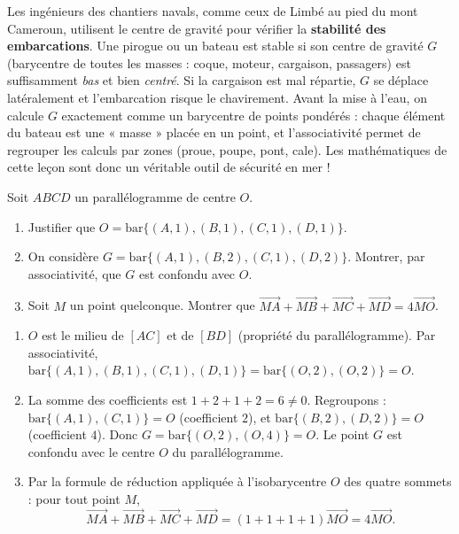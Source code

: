 \documentclass[11pt]{article}
\begin{document}
\begin{savaistu}
Les ingénieurs des chantiers navals, comme ceux de Limbé au pied du mont Cameroun, utilisent le centre de gravité pour vérifier la \textbf{stabilité des embarcations}. Une pirogue ou un bateau est stable si son centre de gravité $G$ (barycentre de toutes les masses : coque, moteur, cargaison, passagers) est suffisamment \emph{bas} et bien \emph{centré}. Si la cargaison est mal répartie, $G$ se déplace latéralement et l'embarcation risque le chavirement. Avant la mise à l'eau, on calcule $G$ exactement comme un barycentre de points pondérés : chaque élément du bateau est une « masse » placée en un point, et l'associativité permet de regrouper les calculs par zones (proue, poupe, pont, cale). Les mathématiques de cette leçon sont donc un véritable outil de sécurité en mer !
\end{savaistu}

\begin{exercice}
Soit $ABCD$ un parallélogramme de centre $O$.
\begin{enumerate}
\item Justifier que $O=\mathrm{bar}\{(A,1),(B,1),(C,1),(D,1)\}$.
\item On considère $G=\mathrm{bar}\{(A,1),(B,2),(C,1),(D,2)\}$. Montrer, par associativité, que $G$ est confondu avec $O$.
\item Soit $M$ un point quelconque. Montrer que $\overrightarrow{MA}+\overrightarrow{MB}+\overrightarrow{MC}+\overrightarrow{MD}=4\overrightarrow{MO}$.
\end{enumerate}
\end{exercice}

\begin{corrige}[Exercice]
\begin{enumerate}
\item $O$ est le milieu de $[AC]$ et de $[BD]$ (propriété du parallélogramme). Par associativité, $\mathrm{bar}\{(A,1),(B,1),(C,1),(D,1)\}=\mathrm{bar}\{(O,2),(O,2)\}=O$.
\item La somme des coefficients est $1+2+1+2=6\neq 0$. Regroupons : $\mathrm{bar}\{(A,1),(C,1)\}=O$ (coefficient $2$), et $\mathrm{bar}\{(B,2),(D,2)\}=O$ (coefficient $4$). Donc $G=\mathrm{bar}\{(O,2),(O,4)\}=O$. Le point $G$ est confondu avec le centre $O$ du parallélogramme.
\item Par la formule de réduction appliquée à l'isobarycentre $O$ des quatre sommets : pour tout point $M$,
\[
\overrightarrow{MA}+\overrightarrow{MB}+\overrightarrow{MC}+\overrightarrow{MD}=(1+1+1+1)\overrightarrow{MO}=4\overrightarrow{MO}.
\]
\end{enumerate}
\end{corrige}
\end{document}
